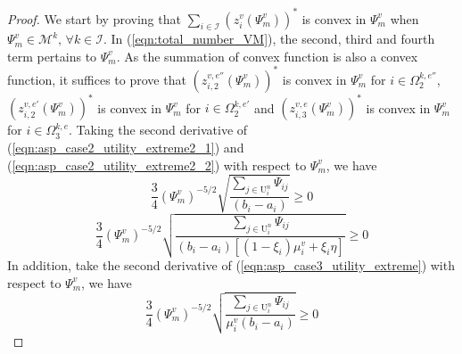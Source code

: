 \documentclass[conference]{IEEEtran}
\begin{document}
\begin{proof}
We start by proving that $\sum_{i \in \mathcal{I}} (z_{i}^v(\Psi_m^v))^*$ is convex in $\Psi_m^v$ when $\Psi_m^v \in \mathcal{M}^k,\, \forall k \in \mathcal{I}$. In (\ref{eqn:total_number_VM}), the second, third and fourth term pertains to $\Psi_m^v$. As the summation of convex function is also a convex function, it suffices to prove that $(z_{i,2}^{v,e''}(\Psi_m^v))^*$ is convex in $\Psi_m^v$ for $i \in \Omega_2^{k,e''}$, $(z_{i,2}^{v,e'}(\Psi_m^v))^*$ is convex in $\Psi_m^v$ for $i \in \Omega_2^{k,e'}$ and $(z_{i,3}^{v,e}(\Psi_m^v))^*$ is convex in $\Psi_m^v$ for $i \in \Omega_3^{k,e}$. Taking the second derivative of (\ref{eqn:asp_case2_utility_extreme2_1}) and (\ref{eqn:asp_case2_utility_extreme2_2}) with respect to $\Psi_m^v$, we have
\begin{equation}
\frac{3}{4}(\Psi_m^v)^{-5/2}\sqrt{\frac{\sum_{j \in \mathrm{U}_i^n}\Psi_{ij}}{(b_i-a_i)}} \geq 0
\end{equation}
\begin{equation}
\frac{3}{4}(\Psi_m^v)^{-5/2}\sqrt{\frac{\sum_{j \in \mathrm{U}_i^n}\Psi_{ij}}{(b_i-a_i)[(1-\xi_i)\mu_i^v + \xi_i \eta]}} \geq 0
\end{equation}
In addition, take the second derivative of (\ref{eqn:asp_case3_utility_extreme}) with respect to $\Psi_m^v$, we have
\begin{equation}
\frac{3}{4}(\Psi_m^v)^{-5/2}\sqrt{\frac{\sum_{j \in \mathrm{U}_i^n}\Psi_{ij}}{\mu_i^v(b_i-a_i)}} \geq 0
\end{equation}


\end{proof}
\end{document}
